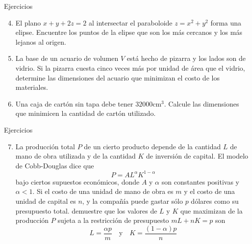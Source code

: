 \begin{frame}{Ejercicios}
  \begin{enumerate}
    \setcounter{enumi}{3}
    \item El plano $x+y+2z = 2$ al intersectar el paraboloide $z = x^2+y^2$ forma una elipse. Encuentre los puntos de la elipse que son los más cercanos y los más lejanos al origen.\\[0.25cm]
    \item La base de un acuario de volumen $V$ está hecho de pizarra y los lados son de vidrio. Si la pizarra cuesta cinco veces más por unidad de área que el vidrio, determine las dimensiones del acuario que minimizan el costo de los materiales.\\[0.25cm]
    \item Una caja de cartón sin tapa debe tener $32000\text{cm}^3$. Calcule las dimensiones que minimicen la cantidad de cartón utilizado.\\[0.25cm]
  \end{enumerate}
\end{frame}

\begin{frame}{Ejercicios}
  \begin{enumerate}
    \setcounter{enumi}{6}
    \item La producción total $P$ de un cierto producto depende de la cantidad $L$ de mano de obra utilizada y de la cantidad $K$ de inversión de capital. El modelo de Cobb-Douglas dice que
    $$P = AL^{\alpha}K^{1-\alpha}$$
    bajo ciertos supuestos económicos, donde $A$ y $\alpha$ son constantes positivas y $\alpha<1$. Si el costo de una unidad de mano de obra es $m$ y el costo de una unidad de capital es $n$, y la compañía puede gastar sólo $p$ dólares como su presupuesto total. demuestre que los valores de $L$ y $K$ que maximizan de la producción $P$ sujeta a la restricción de presupuesto $mL+nK = p$ son
    $$L = \dfrac{\alpha p}{m}\quad\text{y}\quad K = \dfrac{(1-\alpha)p}{n}$$
  \end{enumerate}
\end{frame}

